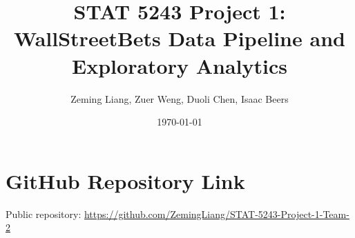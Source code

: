 \documentclass[11pt]{article}
\title{STAT 5243 Project 1: WallStreetBets Data Pipeline and Exploratory Analytics}
\author{Zeming Liang, Zuer Weng, Duoli Chen, Isaac Beers}
\date{\today}
\begin{document}
\maketitle
\tableofcontents
\newpage









\section{GitHub Repository Link}
Public repository: \url{https://github.com/ZemingLiang/STAT-5243-Project-1-Team-2}


\end{document}
